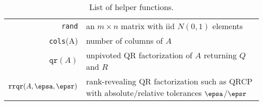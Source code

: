 \begin{table}
\centering
\begin{tabular}{r|p{}}
\hline
\texttt{rand} & an $m\times n$ matrix with iid $N(0,1)$ elements \\
\texttt{cols}(A) & number of columns of $A$ \\
$\texttt{qr}(A)$ & unpivoted QR factorization of $A$ returning $Q$ and $R$ \\
$\texttt{rrqr}(A,\epsa,\epsr)$ & rank-revealing QR factorization such as QRCP
    with absolute/relative tolerances $\epsa$/$\epsr$ \\
\hline
\end{tabular}
\caption{List of helper functions.}
\label{tab:rand_helper_funcs}
\end{table}
